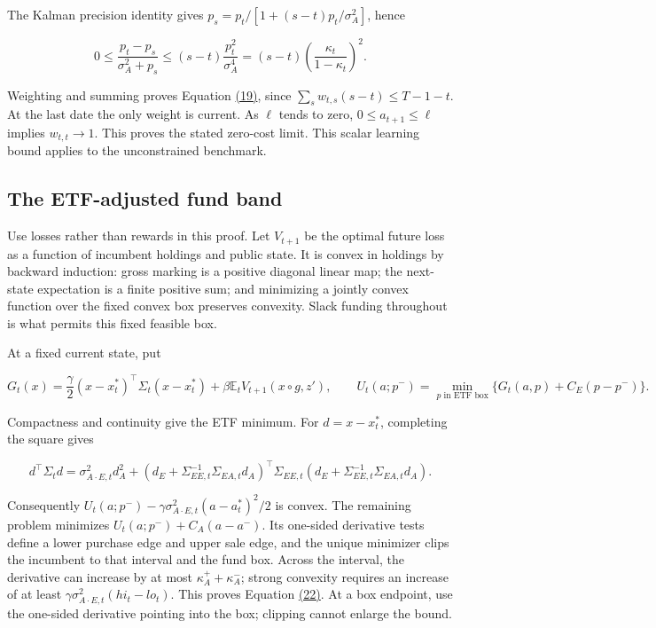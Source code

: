 \documentclass[11pt]{article}
\begin{document}
The Kalman precision identity gives \(p_s=p_t/[1+(s-t)p_t/\sigma_A^2]\), hence

\begin{equation*}
0\leq\frac{p_t-p_s}{\sigma_A^2+p_s}
\leq(s-t)\frac{p_t^2}{\sigma_A^4}
=(s-t)\left(\frac{\kappa_t}{1-\kappa_t}\right)^2.
\end{equation*}

Weighting and summing proves Equation \hyperref[eq:19]{(19)}, since \(\sum_s w_{t,s}(s-t)\leq T-1-t\). At the last date the only weight is current. As \(\ell\) tends to zero, \(0\leq a_{t+1}\leq\ell\) implies \(w_{t,t}\to1\). This proves the stated zero-cost limit. This scalar learning bound applies to the unconstrained benchmark.

\subsection{The ETF-adjusted fund band}\label{sec:D.5}

Use losses rather than rewards in this proof. Let \(V_{t+1}\) be the optimal future loss as a function of incumbent holdings and public state. It is convex in holdings by backward induction: gross marking is a positive diagonal linear map; the next-state expectation is a finite positive sum; and minimizing a jointly convex function over the fixed convex box preserves convexity. Slack funding throughout is what permits this fixed feasible box.

At a fixed current state, put

\begin{equation*}
G_t(x)=\frac\gamma2(x-x_t^*)^\top\Sigma_t(x-x_t^*)
+\beta\mathbb E_tV_{t+1}(x\mathbin{\circ}g,z'),
\qquad
U_t(a;p^-)=\min_{p\text{ in ETF box}}\{G_t(a,p)+C_E(p-p^-)\}.
\end{equation*}

Compactness and continuity give the ETF minimum. For \(d=x-x_t^*\), completing the square gives

\begin{equation*}
d^\top\Sigma_t d=
\sigma^2_{A\cdot E,t}d_A^2+
(d_E+\Sigma_{EE,t}^{-1}\Sigma_{EA,t}d_A)^\top
\Sigma_{EE,t}(d_E+\Sigma_{EE,t}^{-1}\Sigma_{EA,t}d_A).
\end{equation*}

Consequently \(U_t(a;p^-)-\gamma\sigma^2_{A\cdot E,t}(a-a_t^*)^2/2\) is convex. The remaining problem minimizes \(U_t(a;p^-)+C_A(a-a^-)\). Its one-sided derivative tests define a lower purchase edge and upper sale edge, and the unique minimizer clips the incumbent to that interval and the fund box. Across the interval, the derivative can increase by at most \(\kappa_A^++\kappa_A^-\); strong convexity requires an increase of at least \(\gamma\sigma^2_{A\cdot E,t}(hi_t-lo_t)\). This proves Equation \hyperref[eq:22]{(22)}. At a box endpoint, use the one-sided derivative pointing into the box; clipping cannot enlarge the bound.
\end{document}
